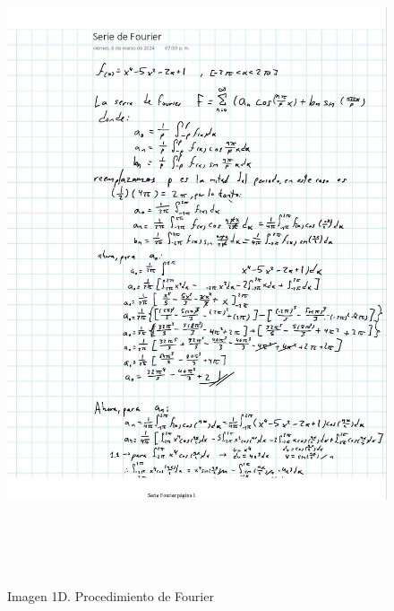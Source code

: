 \begin{figure}[H]
	\centering
	\includegraphics[width=5.93125in,height=7.67516in]{media/image59.jpg}
	\caption{Imagen 1D. Procedimiento de Fourier}
\end{figure}

